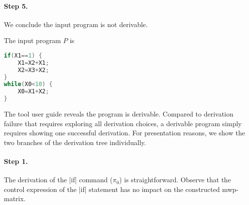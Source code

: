 \begin{example}
\paragraph*{Step 5.} We conclude the input program is not derivable.
\end{example}

\begin{example}\label{ex:while1}
The input program \(P\) is
\begin{lstlisting}[language=C,numbers=none]
if(X1==1) {
    X1=X2+X1;
    X2=X3+X2;
}
while(X0<10) {
    X0=X1+X2;
}
\end{lstlisting}
The tool user guide reveals the program is derivable.
Compared to derivation failure that requires exploring all derivation choices,
a derivable program simply requires showing one successful derivation.
For presentation reasons, we show the two branches of the derivation tree individually.

\paragraph*{Step 1.} The derivation of the \pr|if| command (\(\pi_0\)){ }is straightforward.
Observe that the control expression of the \pr|if| statement has no impact on the constructed mwp-matrix.


\end{example}
